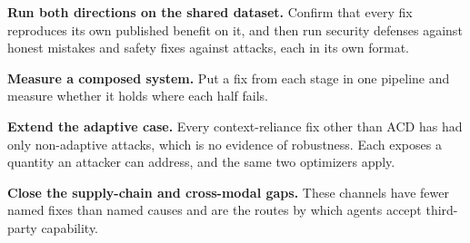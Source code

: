 \textbf{Run both directions on the shared dataset.} Confirm that every
fix reproduces its own published benefit on it, and then run security
defenses against honest mistakes and safety fixes against attacks, each in
its own format.

\textbf{Measure a composed system.} Put a fix from each stage in one
pipeline and measure whether it holds where each half fails.

\textbf{Extend the adaptive case.} Every context-reliance fix other than ACD
has had only non-adaptive attacks, which is no evidence of robustness. Each
exposes a quantity an attacker can address, and the same two optimizers
apply.

\textbf{Close the supply-chain and cross-modal gaps.} These channels have
fewer named fixes than named causes and are the routes by which agents accept
third-party capability.
